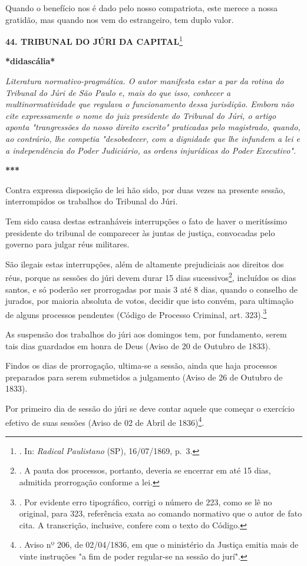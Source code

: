 Quando o benefício nos é dado pelo nosso compatriota, este merece a
nossa gratidão, mas quando nos vem do estrangeiro, tem duplo valor.

\textbf{44. TRIBUNAL DO JÚRI DA CAPITAL}\footnote{. In: \emph{Radical
  Paulistano} (SP), 16/07/1869, p.~3.}

\textbf{*didascália*}

\emph{Literatura normativo-pragmática. O autor manifesta estar a par da
rotina do Tribunal do Júri de São Paulo e, mais do que isso, conhecer a
multinormatividade que regulava o funcionamento dessa jurisdição. Embora
não cite expressamente o nome do juiz presidente do Tribunal do Júri, o
artigo aponta "trangressões do nosso direito escrito" praticadas pelo
magistrado, quando, ao contrário, lhe competia "desobedecer, com a
dignidade que lhe infundem a lei e a independência do Poder Judiciário,
as ordens injurídicas do Poder Executivo".}

\textbf{***}

Contra expressa disposição de lei hão sido, por duas vezes na presente
sessão, interrompidos os trabalhos do Tribunal do Júri.

Tem sido causa destas estranháveis interrupções o fato de haver o
meritíssimo presidente do tribunal de comparecer às juntas de justiça,
convocadas pelo governo para julgar réus militares.

São ilegais estas interrupções, além de altamente prejudiciais aos
direitos dos réus, porque as sessões do júri devem durar 15 dias
sucessivos\footnote{. A pauta dos processos, portanto, deveria se
  encerrar em até 15 dias, admitida prorrogação conforme a lei.},
incluídos os dias santos, e só poderão ser prorrogadas por mais 3 até 8
dias, quando o conselho de jurados, por maioria absoluta de votos,
decidir que isto convém, para ultimação de alguns processos pendentes
(Código de Processo Criminal, art. 323).\footnote{. Por evidente erro
  tipográfico, corrigi o número de 223, como se lê no original, para
  323, referência exata ao comando normativo que o autor de fato cita. A
  transcrição, inclusive, confere com o texto do Código.}

As suspensão dos trabalhos do júri aos domingos tem, por fundamento,
serem tais dias guardados em honra de Deus (Aviso de 20 de Outubro de
1833).

Findos os dias de prorrogação, ultima-se a sessão, ainda que haja
processos preparados para serem submetidos a julgamento (Aviso de 26 de
Outubro de 1833).

Por primeiro dia de sessão do júri se deve contar aquele que começar o
exercício efetivo de suas sessões (Aviso de 02 de Abril de
1836)\footnote{. Aviso nº 206, de 02/04/1836, em que o ministério da
  Justiça emitia mais de vinte instruções "a fim de poder regular-se na
  sessão do jurí".}.

